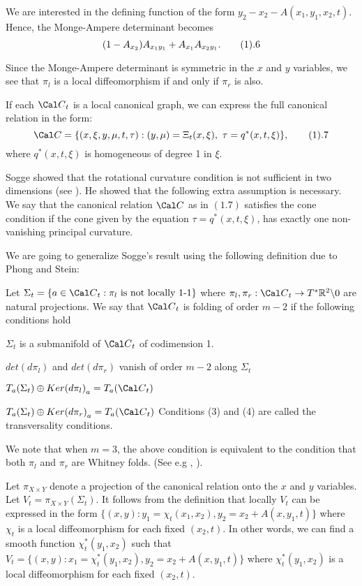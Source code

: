 We are interested in the defining function of the form  
$y_2-x_2-A(x_1,y_1,x_2,t)$. Hence, the
Monge-Ampere determinant becomes $$(1-A_{x_2})A_{x_1y_1}+ 
A_{x_1}A_{x_2y_1}.\tag1.6$$  

Since the Monge-Ampere determinant is symmetric in the $x$ and $y$ variables,
we see that ${\pi}_l$ is a local diffeomorphism if and only if 
${\pi}_r$ is also. 

If each ${\Cal C}_t$ is a local canonical graph, 
we can express the full canonical
relation in the form:
$$ {\Cal C}=\{(x,\xi,y,\mu,t,\tau):(y,\mu)=\Xi_t(x,\xi), 
\ \tau={q}^*(x,t,\xi)\}, 
\tag1.7$$
where ${q}^*(x,t,\xi)$ is homogeneous of degree 1 in $\xi.$ 

Sogge showed that the
rotational curvature condition is not sufficient in two dimensions (see 
\cite{So1}). He showed that the following extra assumption is necessary.
 We say that the canonical relation ${\Cal C}$
as in $(1.7)$ satisfies the cone condition if the cone given by the
equation $\tau=q^{*}(x,t,\xi)$, has exactly one non-vanishing principal
curvature.
\endproclaim

We are going to generalize Sogge's result using the following definition
due to Phong and Stein:

 Let $  {\Sigma}_t=\{ a \in {\Cal C}_t:\pi_l \ 
\text{is not locally 1-1} \} $
where $ \pi_l,\pi_r:
{\Cal C}_t \rightarrow T^* {\Bbb R}^2 \backslash 0 $ are natural 
projections. We say that ${\Cal C}_t$ 
is folding of order $m-2$ if the following 
conditions hold 
\roster \item $ \Sigma_t$ is a submanifold of ${\Cal C}_t$ of 
codimension 1.
\item $det(d{\pi}_l)$ and $det(d{\pi}_r)$ vanish of order $m-2$ along 
$\Sigma_t$\item  $T_a(\Sigma_t)\oplus 
Ker{(d{\pi}_l)}_a =T_a({\Cal C}_t)$ \item 
$T_a(\Sigma_t)\oplus Ker{(d{\pi}_r)}_a=T_a({\Cal C}_t)$
\endroster 
Conditions (3) and (4) are called the transversality conditions.  
\endproclaim

We note that when $m=3$, the above condition is equivalent to the condition
that both ${\pi}_l$ and ${\pi}_r$ are Whitney folds. (See e.g \cite{MlTr},
\cite{Hor1}). 

Let ${\pi}_{X \times Y}$ denote a projection of the canonical relation onto the
$x$ and $y$ variables. Let $V_t={\pi}_{X \times Y}({\Sigma}_t)$. It follows from
the definition that locally $V_t$ can be expressed in the form
$\{(x,y):y_1={\chi}_t(x_1,x_2), y_2=x_2+A(x,y_1,t) \}$ where ${\chi}_t$ is a 
local diffeomorphism for each fixed $(x_2,t)$. In other words, we can find
a smooth function ${\chi}^{*}_t(y_1,x_2)$ such that 
$V_t= \{(x,y):x_1={\chi}^{*}_t(y_1,x_2), y_2=x_2+A(x,y_1,t) \}$ where
${\chi}^{*}_t(y_1,x_2)$ is a local diffeomorphism for each fixed $(x_2,t)$.


